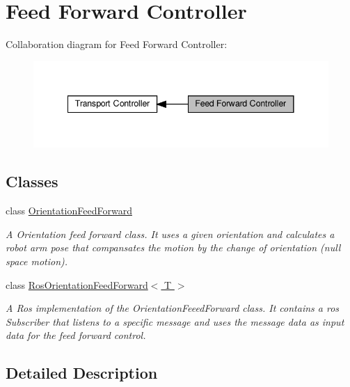 \hypertarget{group__group__feed__forward}{}\section{Feed Forward Controller}
\label{group__group__feed__forward}
Collaboration diagram for Feed Forward Controller\+:\nopagebreak
\begin{figure}[H]
\begin{center}
\leavevmode
\includegraphics[width=341pt]{db/da6/group__group__feed__forward}
\end{center}
\end{figure}
\subsection*{Classes}
\begin{DoxyCompactItemize}
\item 
class \hyperlink{classOrientationFeedForward}{Orientation\+Feed\+Forward}
\begin{DoxyCompactList}\small\item\em A Orientation feed forward class. It uses a given orientation and calculates a robot arm pose that compansates the motion by the change of orientation (null space motion). \end{DoxyCompactList}\item 
class \hyperlink{classRosOrientationFeedForward}{Ros\+Orientation\+Feed\+Forward$<$ T $>$}
\begin{DoxyCompactList}\small\item\em A Ros implementation of the Orientation\+Feeed\+Forward class. It contains a ros Subscriber that listens to a specific message and uses the message data as input data for the feed forward control. \end{DoxyCompactList}\end{DoxyCompactItemize}


\subsection{Detailed Description}
